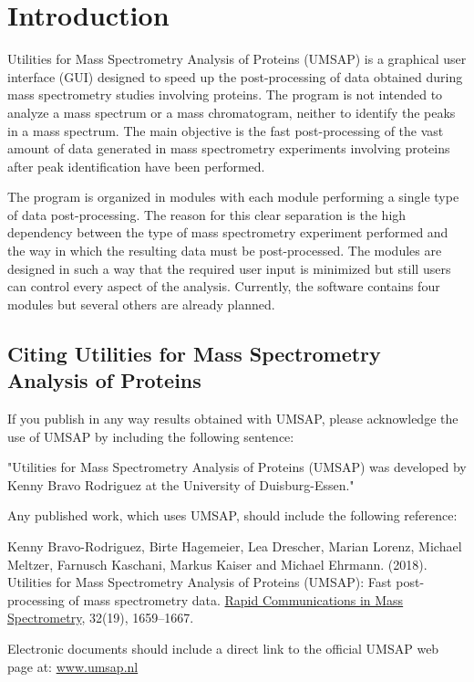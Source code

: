 \chapter{Introduction}

Utilities for Mass Spectrometry Analysis of Proteins (UMSAP) is a graphical user interface (GUI) designed to speed up the post-processing of data obtained during mass spectrometry studies involving proteins. The program is not intended to analyze a mass spectrum or a mass chromatogram, neither to identify the peaks in a mass spectrum. The main objective is the fast post-processing of the vast amount of data generated in mass spectrometry experiments involving proteins after peak identification have been performed.

The program is organized in modules with each module performing a single type of data post-processing. The reason for this clear separation is the high dependency between the type of mass spectrometry experiment performed and the way in which the resulting data must be post-processed. The modules are designed in such a way that the required user input is minimized but still users can control every aspect of the analysis. Currently, the software contains four modules but several others are already planned. 

\section{Citing Utilities for Mass Spectrometry Analysis of Proteins}

If you publish in any way results obtained with UMSAP, please acknowledge the use of UMSAP by including the following sentence:

"Utilities for Mass Spectrometry Analysis of Proteins (UMSAP) was developed by Kenny Bravo Rodriguez at the University of Duisburg-Essen."

Any published work, which uses UMSAP, should include the following reference:

Kenny Bravo-Rodriguez, Birte Hagemeier, Lea Drescher, Marian Lorenz, Michael Meltzer, Farnusch Kaschani, Markus Kaiser and Michael Ehrmann. (\num{2018}). Utilities for Mass Spectrometry Analysis of Proteins (UMSAP): Fast post-processing of mass spectrometry data. \href{https://onlinelibrary.wiley.com/doi/10.1002/rcm.8243}{Rapid Communications in Mass Spectrometry}, \num{32}(\num{19}), \numrange[range-phrase = --]{1659}{1667}.

Electronic documents should include a direct link to the official UMSAP web page at:\newline
\href{https://www.umsap.nl}{www.umsap.nl}

